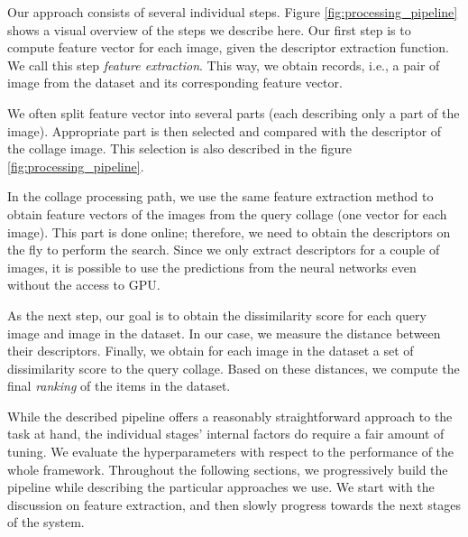 Our approach consists of several individual steps. Figure \ref{fig:processing_pipeline} shows a visual overview of the steps we describe here. Our first step is to compute feature vector for each image, given the descriptor extraction function. We call this step \emph{feature extraction}. This way, we obtain records, i.e., a pair of image from the dataset and its corresponding feature vector. 

We often split feature vector into several parts (each describing only a part of the image). Appropriate part is then selected and compared with the descriptor of the collage image. This selection is also described in the figure \ref{fig:processing_pipeline}.


In the collage processing path, we use the same feature extraction method to obtain feature vectors of the images from the query collage (one vector for each image). This part is done online; therefore, we need to obtain the descriptors on the fly to perform the search. Since we only extract descriptors for a couple of images, it is possible to use the predictions from the neural networks even without the access to GPU.

As the next step, our goal is to obtain the dissimilarity score for each query image and image in the dataset. In our case, we measure the distance between their descriptors. Finally, we obtain for each image in the dataset a set of dissimilarity score to the query collage. Based on these distances, we compute the final \emph{ranking} of the items in the dataset.

While the described pipeline offers a reasonably straightforward approach to the task at hand, the individual stages' internal factors do require a fair amount of tuning. We evaluate the hyperparameters with respect to the performance of the whole framework. Throughout the following sections, we progressively build the pipeline while describing the particular approaches we use. We start with the discussion on feature extraction, and then slowly progress towards the next stages of the system.  



